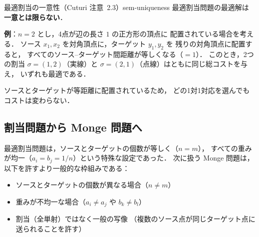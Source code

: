 \begin{remark}{最適割当の一意性（Cuturi 注意~2.3）}{sem-uniqueness}
  最適割当問題の最適解は\textbf{一意とは限らない}．

  \textbf{例}：$n = 2$ とし，4点が辺の長さ $1$ の正方形の頂点に
  配置されている場合を考える．
  ソース $x_1, x_2$ を対角頂点に，ターゲット $y_1, y_2$ を
  残りの対角頂点に配置すると，
  すべてのソース--ターゲット間距離が等しくなる（$= 1$）．
  このとき，2つの割当 $\sigma = (1, 2)$（実線）と
  $\sigma = (2, 1)$（点線）はともに同じ総コストを与え，
  いずれも最適である．

  \begin{center}
  \end{center}

  ソースとターゲットが等距離に配置されているため，
  どの1対1対応を選んでもコストは変わらない．
\end{remark}

\subsection{割当問題から Monge 問題へ}
\label{subsec:sem-assignment-to-monge}

最適割当問題は，ソースとターゲットの個数が等しく（$n = m$），
すべての重みが均一（$a_i = b_j = 1/n$）という特殊な設定であった．
次に扱う Monge 問題は，以下を許すより一般的な枠組みである：
\begin{itemize}
  \item ソースとターゲットの個数が異なる場合（$n \neq m$）
  \item 重みが不均一な場合（$a_i \neq a_j$ や $b_k \neq b_l$）
  \item 割当（全単射）ではなく一般の写像
        （複数のソース点が同じターゲット点に送られることを許す）
\end{itemize}

